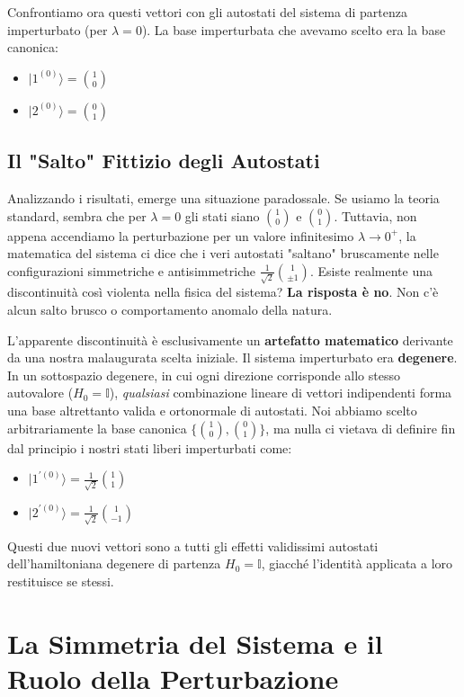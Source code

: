 Confrontiamo ora questi vettori con gli autostati del sistema di partenza imperturbato (per $\lambda=0$). La base imperturbata che avevamo scelto era la base canonica:
\begin{itemize}
\item $\vert{}1^{(0)}\rangle = \binom{1}{0}$
\item $\vert{}2^{(0)}\rangle = \binom{0}{1}$
\end{itemize}

\subsection{Il "Salto" Fittizio degli Autostati}
Analizzando i risultati, emerge una situazione paradossale. Se usiamo la teoria standard, sembra che per $\lambda=0$ gli stati siano $\binom{1}{0}$ e $\binom{0}{1}$. Tuttavia, non appena accendiamo la perturbazione per un valore infinitesimo $\lambda \to 0^+$, la matematica del sistema ci dice che i veri autostati "saltano" bruscamente nelle configurazioni simmetriche e antisimmetriche $\frac{1}{\sqrt{2}}\binom{1}{\pm 1}$.
Esiste realmente una discontinuità così violenta nella fisica del sistema? \textbf{La risposta è no}. Non c'è alcun salto brusco o comportamento anomalo della natura.

L'apparente discontinuità è esclusivamente un \textbf{artefatto matematico} derivante da una nostra malaugurata scelta iniziale. Il sistema imperturbato era \textbf{degenere}. In un sottospazio degenere, in cui ogni direzione corrisponde allo stesso autovalore ($H_0 = \mathbb{I}$), \textit{qualsiasi} combinazione lineare di vettori indipendenti forma una base altrettanto valida e ortonormale di autostati.
Noi abbiamo scelto arbitrariamente la base canonica $\{\binom{1}{0}, \binom{0}{1}\}$, ma nulla ci vietava di definire fin dal principio i nostri stati liberi imperturbati come:
\begin{itemize}
\item $\vert{}1^{\prime(0)}\rangle = \frac{1}{\sqrt{2}} \binom{1}{1}$
\item $\vert{}2^{\prime(0)}\rangle = \frac{1}{\sqrt{2}} \binom{1}{-1}$
\end{itemize}
Questi due nuovi vettori sono a tutti gli effetti validissimi autostati dell'hamiltoniana degenere di partenza $H_0 = \mathbb{I}$, giacché l'identità applicata a loro restituisce se stessi.

\section{La Simmetria del Sistema e il Ruolo della Perturbazione}

